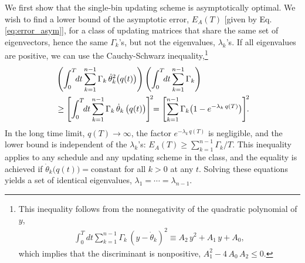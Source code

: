 \documentclass[reprint, superscriptaddress, floatfix]{revtex4-1}
\newcommand{\Err}{E}
\begin{document}
We first show
that the single-bin updating scheme is asymptotically optimal.
%
We wish to find a lower bound of the asymptotic error,
$\Err_A(T)$ [given by Eq. \eqref{eq:error_asym}],
for a class of updating matrices that
share the same set of eigenvectors,
hence the same $\Gamma_k$'s,
but not the eigenvalues,
$\lambda_k$'s.
%
If all eigenvalues are positive,
we can use the Cauchy-Schwarz inequality,\footnote{This
  inequality follows from the nonnegativity of
  the quadratic polynomial of $y$,
  \begin{align*}
  \int_0^T \!\!dt \sum_{k = 1}^{n-1} \Gamma_k \,
      ( y - {\dot \theta}_k )^2
    \equiv
    A_2 \, y^2 + A_1 \, y + A_0
    ,
  \end{align*}
  which implies that the discriminant is nonpositive,
  $A_1^2 - 4 \, A_0 \, A_2 \le 0$.}
%
%
\begin{align}
  &
  \left(
    \int_0^T \!\!dt
      \sum_{k = 1}^{n-1}
        \Gamma_k \, {\dot \theta}_k^2\bigl( q(t) \bigr)
  \right)
  \left(
    \int_0^T \!\!dt
      \sum_{k = 1}^{n-1}
        \Gamma_k
  \right)
  \notag \\
  & %
  \ge
  \Biggl[
    \int_0^T \!\!dt
      \sum_{k = 1}^{n-1}
        \Gamma_k \, {\dot \theta}_k \, \bigl( q(t) \bigr)
  \Biggr]^{\!2}
  \!\!=
  \Biggl[
    \sum_{k = 1}^{n-1} \Gamma_k
      \bigl(
        1 - e^{ -\lambda_k \, q(T) }
      \bigr)
  \Biggr]^{\!2}
  \!\!
  .
  \notag
\end{align}
%
In the long time limit, $q(T) \to \infty$,
the factor $e^{-\lambda_k \, q(T)}$ is negligible,
and the lower bound is independent of the $\lambda_k$'s:
$\Err_A(T) \ge \sum_{k=1}^{n-1} \Gamma_k/T$.
%
This inequality applies to any schedule
and any updating scheme in the class,
and the equality is achieved
if $\dot \theta_k\bigl( q(t) \bigr) = \mathrm{constant}$
for all $k > 0$ at any $t$.
%
Solving these equations yields
a set of identical eigenvalues,
$\lambda_1 = \cdots = \lambda_{n-1}$.
\end{document}
